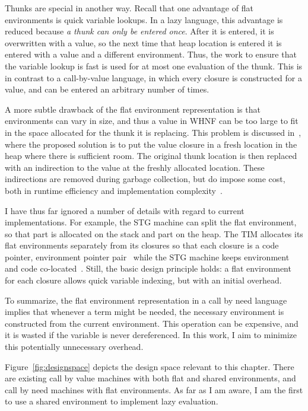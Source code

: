 Thunks are special in another way.  Recall that one advantage of flat
environments is quick variable lookups. In a lazy language, this advantage is
reduced because \emph{a thunk can only be entered once}. After it is entered, it
is overwritten with a value, so the next time that heap location is entered it
is entered with a value and a different environment. Thus, the work to ensure
that the variable lookup is fast is used for at most one evaluation of the
thunk. This is in contrast to a call-by-value language, in which every closure
is constructed for a value, and can be entered an arbitrary number of times. 

A more subtle drawback of the flat environment representation is that
environments can vary in size, and thus a value in WHNF can be too large to fit
in the space allocated for the thunk it is replacing. This problem is discussed
in~\cite{jonesstg}, where the proposed solution is to put the value closure in
a fresh location in the heap where there is sufficient room. The original
thunk location is then replaced with an indirection to the value at the freshly
allocated location. These indirections are removed during garbage collection,
but do impose some cost, both in runtime efficiency and implementation
complexity~\cite{jonesstg}.

I have thus far ignored a number of details with regard to current
implementations. For example, the STG machine can split the flat environment, so
that part is allocated on the stack and part on the heap.  The TIM allocates its
flat environments separately from its closures so that each closure is a code
pointer, environment pointer pair~\cite{TIM} while the STG machine keeps
environment and code co-located~\cite{jonesstg}. Still, the basic design
principle holds: a flat environment for each closure allows quick variable
indexing, but with an initial overhead.

To summarize, the flat environment representation in a call by need language
implies that whenever a term might be needed, the necessary environment is
constructed from the current environment.  This operation can be expensive, and
it is wasted if the variable is never dereferenced. In this work, I aim to
minimize this potentially unnecessary overhead.

Figure~\ref{fig:designspace} depicts the design space relevant to this chapter.
There are existing call by value machines with both flat and shared
environments, and call by need machines with flat environments. As far as I am
aware, I am the first to use a shared environment to implement lazy evaluation. 

